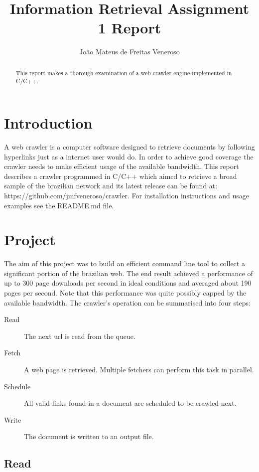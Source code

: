 \documentclass{acmart}
\begin{document}
\title{Information Retrieval Assignment 1 Report}
\author{João Mateus de Freitas Veneroso}

\maketitle

\begin{abstract}
This report makes a thorough examination of a web crawler engine implemented
in C/C++.
\end{abstract}

\section{Introduction}

A web crawler is a computer software designed to retrieve documents by following
hyperlinks just as a internet user would do. In order to achieve 
good coverage the crawler needs to make efficient usage of the available bandwidth.
This report describes a crawler programmed in C/C++ which aimed to retrieve a broad
sample of the brazilian network and its latest release can be found at: 
https://github.com/jmfveneroso/crawler. For installation instructions and usage 
examples see the README.md file. 

\section{Project}
The aim of this project was to build an efficient command line tool to collect a 
significant portion of the brazilian web. The end result achieved a performance of
up to 300 page downloads per second in ideal conditions and averaged about 190 pages 
per second. Note that this performance was quite possibly capped by the available bandwidth.
The crawler's operation can be summarised into four steps:

\begin{description}
  \item [Read]     The next url is read from the queue.
  \item [Fetch]    A web page is retrieved. Multiple fetchers can perform this task in parallel.
  \item [Schedule] All valid links found in a document are scheduled to be crawled next.
  \item [Write]    The document is written to an output file.
\end{description}

\subsection{Read}
\end{document}
